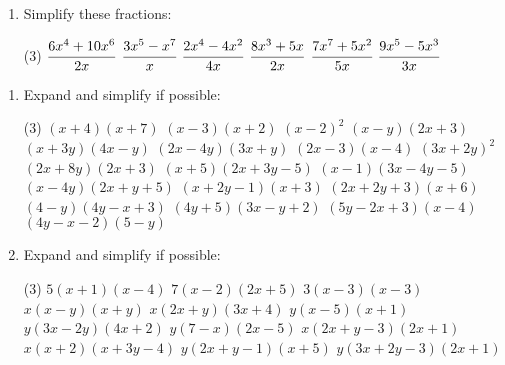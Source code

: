 \documentclass[fleqn]{article}
\begin{document}
\begin{enumerate}
    \vspace{4mm}
    \item Simplify these fractions:
        \begin{tasks}(3) %
            \task $\cfrac{6x^4+10x^6}{2x}$            %
            \task $\cfrac{3x^5-x^7}{x}$               %
            \task $\cfrac{2x^4-4x^2}{4x}$             %
            \task $\cfrac{8x^3+5x}{2x}$               %
            \task $\cfrac{7x^7+5x^2}{5x}$             %
            \task $\cfrac{9x^5-5x^3}{3x}$             %
        \end{tasks}
\end{enumerate}



\exercise{}
\begin{enumerate}
    \item Expand and simplify if possible:
        \begin{tasks}(3) %
            \task $(x+4)(x+7)$            %
            \task $(x-3)(x+2)$            %
            \task $(x-2)^2$               %
            \task $(x-y)(2x+3)$           %
            \task $(x+3y)(4x-y)$          %
            \task $(2x-4y)(3x+y)$         %
            \task $(2x-3)(x-4)$           %
            \task $(3x+2y)^2$             %
            \task $(2x+8y)(2x+3)$         %
            \task $(x+5)(2x+3y-5)$        %
            \task $(x-1)(3x-4y-5)$        %
            \task $(x-4y)(2x+y+5)$        %
            \task $(x+2y-1)(x+3)$         %
            \task $(2x+2y+3)(x+6)$        %
            \task $(4-y)(4y-x+3)$         %
            \task $(4y+5)(3x-y+2)$        %
            \task $(5y-2x+3)(x-4)$        %
            \task $(4y-x-2)(5-y)$         %
        \end{tasks}
    \newpage
    \item Expand and simplify if possible:
        \begin{tasks}(3) %
            \task $5(x+1)(x-4)$           %
            \task $7(x-2)(2x+5)$          %
            \task $3(x-3)(x-3)$           %
            \task $x(x-y)(x+y)$           %
            \task $x(2x+y)(3x+4)$         %
            \task $y(x-5)(x+1)$           %
            \task $y(3x-2y)(4x+2)$        %
            \task $y(7-x)(2x-5)$          %
            \task $x(2x+y-3)(2x+1)$       %
            \task $x(x+2)(x+3y-4)$        %
            \task $y(2x+y-1)(x+5)$        %
            \task $y(3x+2y-3)(2x+1)$      %

\end{tasks}
\end{enumerate}
\end{document}
